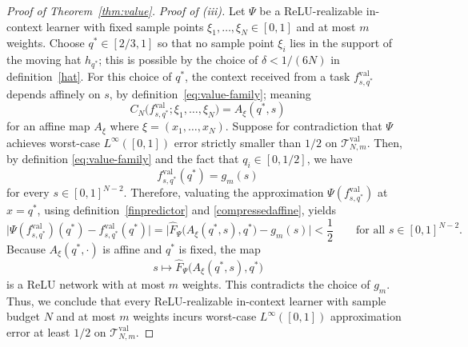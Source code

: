 \documentclass{article}
\begin{document}
\begin{proof}[Proof of Theorem~\ref{thm:value}]
\medskip
\noindent
\emph{Proof of (iii).}
Let $\Psi$ be a ReLU-realizable in-context learner with fixed sample points $\xi_1,\dots,\xi_N\in[0,1]$ and at most $m$ weights. 
Choose $q^\ast\in[2/3,1]$ so that no sample point $\xi_i$ lies in the support of the moving hat $h_{q^\ast}$; this is possible by the choice of $\delta<1/(6N)$ in definition~\eqref{hat}.
For this choice of $q^\ast$, the context received from a task $f^{\mathrm{val}}_{s,q^\ast}$
depends affinely on $s$, by definition~\eqref{eq:value-family}; meaning 
\begin{equation} \label{compressedaffine}
    C_N\bigl(f^{\mathrm{val}}_{s,q^\ast};\xi_1,\dots,\xi_N\bigr)
    =
    A_{\xi}(q^\ast,s)
\end{equation}
for an affine map $A_{\xi}$ where $\xi = (x_1,\dots,x_N)$.
Suppose for contradiction that $\Psi$ achieves worst-case $L^\infty([0,1])$ error strictly
smaller than $1/2$ on $\mathcal{T}_{N,m}^{\mathrm{val}}$. 
Then, by definition \eqref{eq:value-family} and the fact that $q_i\in [0,1/2]$, we have
\[
f^{\mathrm{val}}_{s,q^\ast}(q^\ast)=g_m(s)
\]
for every $s\in[0,1]^{N-2}$. 
Therefore, valuating the approximation $\Psi(f^{\mathrm{val}}_{s,q^\ast})$ at $x=q^\ast$, using definition~\eqref{finpredictor} and \eqref{compressedaffine}, yields
\[
    \bigl|\Psi(f^{\mathrm{val}}_{s,q^\ast})(q^\ast) - f^{\mathrm{val}}_{s,q^\ast}(q^\ast) \bigr|
    =\bigl|\widehat{F}_{\Psi}
    \bigl(A_{\xi}(q^\ast,s),q^\ast\bigr)-g_m(s)\bigr|<\frac12
    \qquad\text{for all }s\in[0,1]^{N-2}.
\]
Because $A_{\xi}(q^\ast,\cdot)$ is affine and $q^\ast$ is fixed, the map
\[
    s\mapsto \widehat{F}_{\Psi}
    \bigl(A_{\xi}(q^\ast,s),q^\ast\bigr) %
\]
is a ReLU network with at most $m$ weights. This contradicts the choice of $g_m$. 
Thus, we conclude that every ReLU-realizable
in-context learner with sample budget $N$ and at most $m$ weights incurs worst-case $L^{\infty}([0,1])$ approximation error at least $1/2$ on $\mathcal{T}_{N,m}^{\mathrm{val}}$.


\end{proof}
\end{document}
